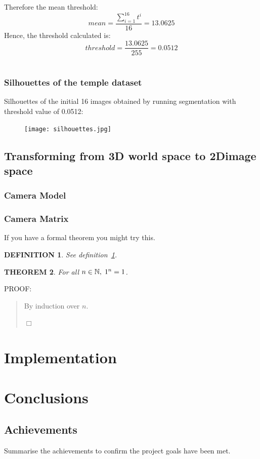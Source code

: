 \documentclass[a4paper]{report}
\newtheorem{theorem}{THEOREM}
\newtheorem{definition}[theorem]{DEFINITION}
\newenvironment{proof}{
PROOF:
\begin{quotation}}{
$\Box$ \end{quotation}}
\newcommand{\nats}{\mbox{\( \mathbb N \)}}
\begin{document}
Therefore the mean threshold:
\begin{equation}
mean = \frac{\sum \limits_{i=1}^{16} t^i}{16} = 13.0625
\end{equation}
Hence, the threshold calculated is:
\begin{equation}
threshold = \frac{13.0625}{255} = 0.0512
\end{equation}
\\
\subsection{Silhouettes of the temple dataset}
Silhouettes of the initial 16 images obtained by  running segmentation with threshold value of 0.0512:
\begin{figure}[h]
\texttt{[image: silhouettes.jpg]} 
\end{figure}
\newpage
\section{Transforming from 3D  world space to 2Dimage space}
\subsection{Camera Model}
\newpage

\subsection{Camera Matrix}

If you have a formal theorem you might try this.
\begin{definition}\label{def}
See definition~\ref{def}.
\end{definition}
\begin{theorem}
For all $n\in\nats,\; 1^n=1$.
\end{theorem}
\begin{proof}
By induction over $n$.
\end{proof}
\newpage

\chapter{Implementation}


\chapter{Conclusions}
\section{Achievements}
Summarise the achievements to confirm the project goals have been met.
\end{document}
